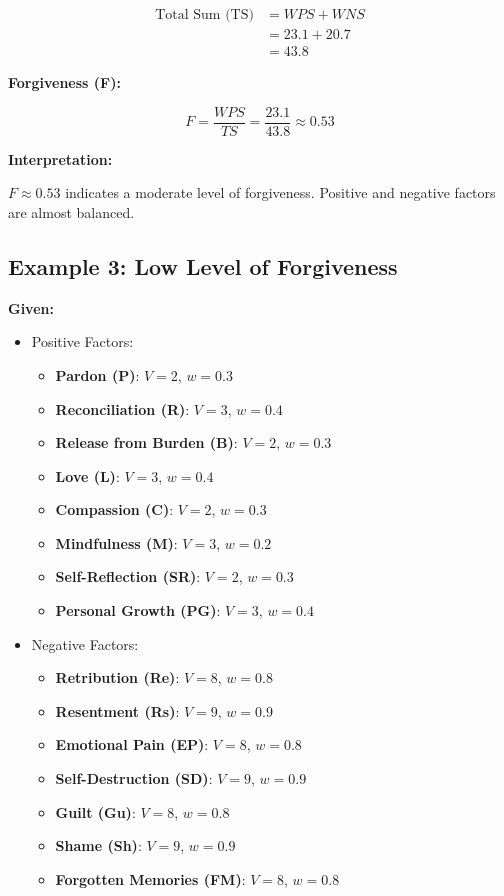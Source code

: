 \documentclass{article}
\begin{document}
\begin{align*}
\text{Total Sum (TS)} & = WPS + WNS \\
& = 23.1 + 20.7 \\
& = 43.8
\end{align*}

\textbf{Forgiveness (F):}

\[
F = \frac{WPS}{TS} = \frac{23.1}{43.8} \approx 0.53
\]

\textbf{Interpretation:}

$F \approx 0.53$ indicates a moderate level of forgiveness. Positive and negative factors are almost balanced.

\subsection*{Example 3: Low Level of Forgiveness}

\textbf{Given:}

\begin{itemize}
    \item Positive Factors:
    \begin{itemize}
        \item \textbf{Pardon (P)}: $V = 2$, $w = 0.3$
        \item \textbf{Reconciliation (R)}: $V = 3$, $w = 0.4$
        \item \textbf{Release from Burden (B)}: $V = 2$, $w = 0.3$
        \item \textbf{Love (L)}: $V = 3$, $w = 0.4$
        \item \textbf{Compassion (C)}: $V = 2$, $w = 0.3$
        \item \textbf{Mindfulness (M)}: $V = 3$, $w = 0.2$
        \item \textbf{Self-Reflection (SR)}: $V = 2$, $w = 0.3$
        \item \textbf{Personal Growth (PG)}: $V = 3$, $w = 0.4$
    \end{itemize}
    \item Negative Factors:
    \begin{itemize}
        \item \textbf{Retribution (Re)}: $V = 8$, $w = 0.8$
        \item \textbf{Resentment (Rs)}: $V = 9$, $w = 0.9$
        \item \textbf{Emotional Pain (EP)}: $V = 8$, $w = 0.8$
        \item \textbf{Self-Destruction (SD)}: $V = 9$, $w = 0.9$
        \item \textbf{Guilt (Gu)}: $V = 8$, $w = 0.8$
        \item \textbf{Shame (Sh)}: $V = 9$, $w = 0.9$
        \item \textbf{Forgotten Memories (FM)}: $V = 8$, $w = 0.8$
    \end{itemize}
\end{itemize}
\end{document}
